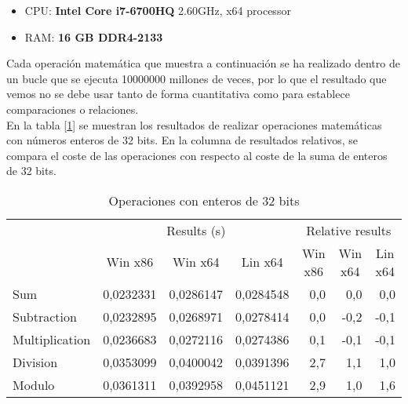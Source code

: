 \begin{itemize}
	\item CPU: \textbf{Intel Core i7-6700HQ} 2.60GHz, x64 processor
	\item RAM: \textbf{16 GB DDR4-2133}
\end{itemize}

Cada operación matemática que muestra a continuación se ha realizado dentro de un bucle que se ejecuta 10000000 millones de veces, por lo que el resultado que vemos no se debe usar tanto de forma cuantitativa como para establece comparaciones o relaciones.\\

En la tabla [\ref{tab:int32}] se muestran los resultados de realizar operaciones matemáticas con números enteros de 32 bits. En la columna de resultados relativos, se compara el coste de las operaciones con respecto al coste de la suma de enteros de 32 bits.\\

\begin{table}[h]
\centering
\begin{tabular}{@{}l|rrr|rrr|@{}}
\cmidrule(l){2-7}
                                     & \multicolumn{3}{c|}{Results (s)}                                                               & \multicolumn{3}{c|}{Relative results}                                                      \\ \cmidrule(l){2-7} 
                                     & \multicolumn{1}{c|}{Win x86} & \multicolumn{1}{c|}{Win x64} & \multicolumn{1}{c|}{Lin x64} & \multicolumn{1}{c|}{Win x86} & \multicolumn{1}{c|}{Win x64} & \multicolumn{1}{c|}{Lin x64} \\ \midrule
\multicolumn{1}{|l|}{Sum}            & 0,0232331                    & 0,0286147                    & 0,0284548                    & 0,0                          & 0,0                          & 0,0                          \\ \cmidrule(r){1-1}
\multicolumn{1}{|l|}{Subtraction}    & 0,0232895                    & 0,0268971                    & 0,0278414                    & 0,0                          & -0,2                         & -0,1                         \\ \cmidrule(r){1-1}
\multicolumn{1}{|l|}{Multiplication} & 0,0236683                    & 0,0272116                    & 0,0274386                    & 0,1                          & -0,1                         & -0,1                         \\ \cmidrule(r){1-1}
\multicolumn{1}{|l|}{Division}       & 0,0353099                    & 0,0400042                    & 0,0391396                    & 2,7                          & 1,1                          & 1,0                          \\ \cmidrule(r){1-1}
\multicolumn{1}{|l|}{Modulo}         & 0,0361311                    & 0,0392958                    & 0,0451121                    & 2,9                          & 1,0                          & 1,6                          \\ \bottomrule
\end{tabular}
\caption{Operaciones con enteros de 32 bits}
\label{tab:int32}
\end{table}

